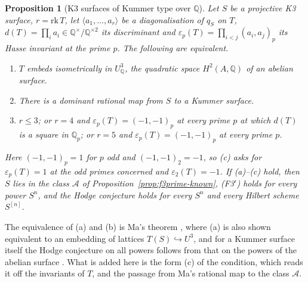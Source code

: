 \documentclass[11pt,reqno]{amsart}
\numberwithin{equation}{section}
\theoremstyle{plain}
\newtheorem{proposition}[theorem]{Proposition}
\theoremstyle{definition}
\newcommand{\QQ}{\mathbb{Q}}
\newcommand{\Fiii}{\texorpdfstring{\textup{(F3$'$)}}{(F3')}}
\begin{document}
\begin{proposition}[K3 surfaces of Kummer type over $\QQ$]\label{prop:kummerq}
Let $S$ be a projective K3 surface, $r=\mathrm{rk}\,T$, let $\langle a_{1},\dots,a_{r}\rangle$ be a diagonalisation of $q_{S}$ on $T$, $d(T)=\prod_{i}a_{i}\in\QQ^{\times}/\QQ^{\times2}$ its discriminant and $\varepsilon_{p}(T)=\prod_{i<j}(a_{i},a_{j})_{p}$ its Hasse invariant at the prime $p$. The following are equivalent.
\begin{enumerate}[label=\textup{(\alph*)},leftmargin=2.4em,itemsep=2pt]
\item $T$ embeds isometrically in $U_{\QQ}^{3}$, the quadratic space $H^{2}(A,\QQ)$ of an abelian surface.
\item There is a dominant rational map from $S$ to a Kummer surface.
\item $r\le3$; or $r=4$ and $\varepsilon_{p}(T)=(-1,-1)_{p}$ at every prime $p$ at which $d(T)$ is a square in $\QQ_{p}$; or $r=5$ and $\varepsilon_{p}(T)=(-1,-1)_{p}$ at every prime $p$.
\end{enumerate}
Here $(-1,-1)_{p}=1$ for $p$ odd and $(-1,-1)_{2}=-1$, so (c) asks for $\varepsilon_{p}(T)=1$ at the odd primes concerned and $\varepsilon_{2}(T)=-1$. If (a)--(c) hold, then $S$ lies in the class $\mathcal{A}$ of Proposition~\ref{prop:f3prime-known}, \Fiii{} holds for every power $S^{n}$, and the Hodge conjecture holds for every $S^{n}$ and every Hilbert scheme $S^{[n]}$.
\end{proposition}

The equivalence of (a) and (b) is Ma's theorem \cite[Prop.~3.2]{Ma12}, where (a) is also shown equivalent to an embedding of lattices $T(S)\hookrightarrow U^{3}$, and for a Kummer surface itself the Hodge conjecture on all powers follows from that on the powers of the abelian surface \cite[\S0.2]{Var25}. What is added here is the form (c) of the condition, which reads it off the invariants of $T$, and the passage from Ma's rational map to the class $\mathcal{A}$.
\end{document}
